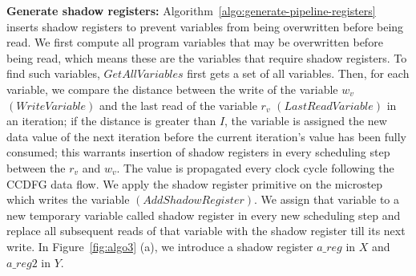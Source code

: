 {\bf Generate shadow registers:} Algorithm~\ref{algo:generate-pipeline-registers} inserts shadow registers
to prevent variables from being overwritten before being read. We first compute all program variables that may be
overwritten before being read, which means these are the variables that require shadow registers. To find such variables,
 $GetAllVariables$ first gets a set of all variables. Then, for each variable, we compare the distance between the write of
  the variable $w_v$ $(WriteVariable)$ and the last read of the variable $r_v$ $(LastReadVariable)$ in an iteration; if the
   distance is greater than $I$, the variable is assigned the new data value of the next iteration before the current iteration's value
    has been fully consumed; this warrants insertion of shadow registers in every scheduling step between the $r_v$ and $w_v$. The value is propagated every clock cycle following the CCDFG data flow.
We apply the shadow register primitive on the microstep which writes the variable $(AddShadowRegister)$. We assign that
 variable to a new temporary variable called shadow register in every new scheduling step and replace all subsequent reads of that variable with the shadow register till its next write. In Figure~\ref{fig:algo3} (a), we introduce a shadow register $a\_reg$ in $X$ and $a\_reg2$ in $Y$.


